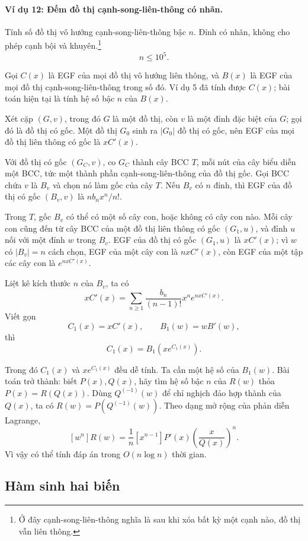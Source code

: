 \documentclass[11pt]{article}
\begin{document}
\paragraph{Ví dụ 12: Đếm đồ thị cạnh-song-liên-thông có nhãn.}
Tính số đồ thị vô hướng cạnh-song-liên-thông bậc \(n\). Đỉnh có nhãn, không cho
phép cạnh bội và khuyên.\footnote{Ở đây cạnh-song-liên-thông nghĩa là sau khi
xóa bất kỳ một cạnh nào, đồ thị vẫn liên thông.}
\[
  n\le 10^5.
\]

Gọi \(C(x)\) là EGF của mọi đồ thị vô hướng liên thông, và \(B(x)\) là EGF của
mọi đồ thị cạnh-song-liên-thông trong số đó. Ví dụ 5 đã tính được \(C(x)\); bài
toán hiện tại là tính hệ số bậc \(n\) của \(B(x)\).

Xét cặp \((G,v)\), trong đó \(G\) là một đồ thị, còn \(v\) là một đỉnh đặc biệt
của \(G\); gọi đó là đồ thị có gốc. Một đồ thị \(G_0\) sinh ra \(|G_0|\) đồ thị
có gốc, nên EGF của mọi đồ thị liên thông có gốc là \(xC'(x)\).

Với đồ thị có gốc \((G_C,v)\), co \(G_C\) thành cây BCC \(T\), mỗi nút của cây
biểu diễn một BCC, tức một thành phần cạnh-song-liên-thông của đồ thị gốc. Gọi
BCC chứa \(v\) là \(B_v\) và chọn nó làm gốc của cây \(T\). Nếu \(B_v\) có
\(n\) đỉnh, thì EGF của đồ thị có gốc \((B_v,v)\) là \(n b_n x^n/n!\).

Trong \(T\), gốc \(B_v\) có thể có một số cây con, hoặc không có cây con nào.
Mỗi cây con cũng đến từ cây BCC của một đồ thị liên thông có gốc \((G_1,u)\),
và đỉnh \(u\) nối với một đỉnh \(w\) trong \(B_v\). EGF của đồ thị có gốc
\((G_1,u)\) là \(xC'(x)\); vì \(w\) có \(|B_v|=n\) cách chọn, EGF của một cây
con là \(n xC'(x)\), còn EGF của một tập các cây con là \(e^{nxC'(x)}\).

Liệt kê kích thước \(n\) của \(B_v\), ta có
\[
  xC'(x)=\sum_{n\ge 1}\frac{b_n}{(n-1)!}x^n e^{nxC'(x)}. \tag{9.5}
\]
Viết gọn
\[
  C_1(x)=xC'(x),\qquad B_1(w)=wB'(w),
\]
thì
\[
  C_1(x)=B_1(xe^{C_1(x)}). \tag{9.6}
\]

Trong đó \(C_1(x)\) và \(xe^{C_1(x)}\) đều dễ tính. Ta cần một hệ số của
\(B_1(w)\). Bài toán trở thành: biết \(P(x),Q(x)\), hãy tìm hệ số bậc \(n\) của
\(R(w)\) thỏa \(P(x)=R(Q(x))\). Dùng \(Q^{(-1)}(w)\) để chỉ nghịch đảo hợp
thành của \(Q(x)\), ta có \(R(w)=P(Q^{(-1)}(w))\). Theo dạng mở rộng của phản
diễn Lagrange,
\[
  [w^n]R(w)=\frac1n[x^{n-1}]P'(x)\left(\frac{x}{Q(x)}\right)^n.
\]
Vì vậy có thể tính đáp án trong \(O(n\log n)\) thời gian.

\subsection{Hàm sinh hai biến}
\end{document}
